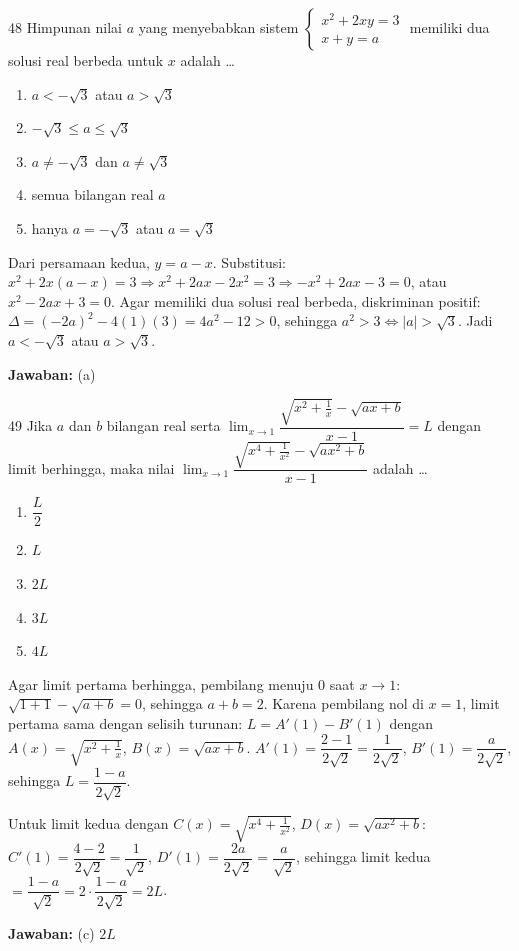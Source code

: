 \documentclass[11pt]{article}
\newenvironment{pil}{\begin{enumerate}[label=(\alph*),leftmargin=*,itemsep=1pt,topsep=3pt]}{\end{enumerate}}
\newcommand{\jw}[1]{\par\smallskip\noindent\textbf{Jawaban:} #1}
\begin{document}
\begin{soalbox}{48}
Himpunan nilai $a$ yang menyebabkan sistem $\begin{cases}x^2+2xy=3\\ x+y=a\end{cases}$ memiliki dua solusi real berbeda untuk $x$ adalah \ldots
\begin{pil}\item $a<-\sqrt{3}$ atau $a>\sqrt{3}$ \item $-\sqrt{3}\leq a\leq\sqrt{3}$ \item $a\neq-\sqrt{3}$ dan $a\neq\sqrt{3}$ \item semua bilangan real $a$ \item hanya $a=-\sqrt{3}$ atau $a=\sqrt{3}$\end{pil}
\end{soalbox}
\begin{pembox}
Dari persamaan kedua, $y=a-x$. Substitusi: $x^2+2x(a-x)=3\Rightarrow x^2+2ax-2x^2=3\Rightarrow-x^2+2ax-3=0$, atau $x^2-2ax+3=0$. Agar memiliki dua solusi real berbeda, diskriminan positif: $\Delta=(-2a)^2-4(1)(3)=4a^2-12>0$, sehingga $a^2>3\Leftrightarrow|a|>\sqrt{3}$. Jadi $a<-\sqrt{3}$ atau $a>\sqrt{3}$.
\jw{(a)}
\end{pembox}

\begin{soalbox}{49}
Jika $a$ dan $b$ bilangan real serta $\displaystyle\lim_{x\to1}\dfrac{\sqrt{x^2+\tfrac{1}{x}}-\sqrt{ax+b}}{x-1}=L$ dengan limit berhingga, maka nilai $\displaystyle\lim_{x\to1}\dfrac{\sqrt{x^4+\tfrac{1}{x^2}}-\sqrt{ax^2+b}}{x-1}$ adalah \ldots
\begin{pil}\item $\dfrac{L}{2}$ \item $L$ \item $2L$ \item $3L$ \item $4L$\end{pil}
\end{soalbox}
\begin{pembox}
Agar limit pertama berhingga, pembilang menuju 0 saat $x\to1$: $\sqrt{1+1}-\sqrt{a+b}=0$, sehingga $a+b=2$. Karena pembilang nol di $x=1$, limit pertama sama dengan selisih turunan: $L=A'(1)-B'(1)$ dengan $A(x)=\sqrt{x^2+\tfrac{1}{x}}$, $B(x)=\sqrt{ax+b}$. $A'(1)=\dfrac{2-1}{2\sqrt{2}}=\dfrac{1}{2\sqrt{2}}$, $B'(1)=\dfrac{a}{2\sqrt{2}}$, sehingga $L=\dfrac{1-a}{2\sqrt{2}}$.

Untuk limit kedua dengan $C(x)=\sqrt{x^4+\tfrac{1}{x^2}}$, $D(x)=\sqrt{ax^2+b}$: $C'(1)=\dfrac{4-2}{2\sqrt{2}}=\dfrac{1}{\sqrt{2}}$, $D'(1)=\dfrac{2a}{2\sqrt{2}}=\dfrac{a}{\sqrt{2}}$, sehingga limit kedua $=\dfrac{1-a}{\sqrt{2}}=2\cdot\dfrac{1-a}{2\sqrt{2}}=2L$.
\jw{(c) $2L$}
\end{pembox}
\end{document}
